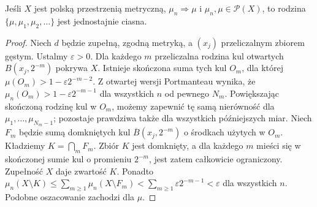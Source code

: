 \begin{lemat}
\label{lem:weak-sequence-tight-22}
Jeśli $X$ jest polską przestrzenią metryczną,
$\mu_n\Rightarrow\mu$ i $\mu_n,\mu\in\mathcal P(X)$,
to rodzina $\{\mu,\mu_1,\mu_2,\ldots\}$ jest
jednostajnie ciasna.
\end{lemat}
\begin{proof}
Niech $d$ będzie zupełną, zgodną metryką, a $(x_j)$
przeliczalnym zbiorem gęstym. Ustalmy $\varepsilon>0$.
Dla każdego $m$ przeliczalna rodzina kul otwartych
$B(x_j,2^{-m})$ pokrywa $X$. Istnieje skończona
suma tych kul $O_m$, dla której
$\mu(O_m)>1-\varepsilon2^{-m-2}$.
Z otwartej wersji Portmanteau wynika, że
$\mu_n(O_m)>1-\varepsilon2^{-m-1}$ dla wszystkich
$n$ od pewnego $N_m$.
Powiększając skończoną rodzinę kul w $O_m$,
możemy zapewnić tę samą nierówność dla
$\mu_1,\ldots,\mu_{N_m-1}$; pozostaje prawdziwa
także dla wszystkich późniejszych miar.
Niech $F_m$ będzie sumą domkniętych kul
$\overline B(x_j,2^{-m})$ o środkach użytych w $O_m$.
Kładziemy $K=\bigcap_mF_m$. Zbiór $K$ jest domknięty,
a dla każdego $m$ mieści się w skończonej sumie kul
o promieniu $2^{-m}$, jest zatem całkowicie ograniczony.
Zupełność $X$ daje zwartość $K$. Ponadto
$\mu_n(X\setminus K)\le\sum_{m\ge1}\mu_n(X\setminus F_m)
<\sum_{m\ge1}\varepsilon2^{-m-1}<\varepsilon$
dla wszystkich $n$. Podobne oszacowanie zachodzi dla $\mu$.
\end{proof}

